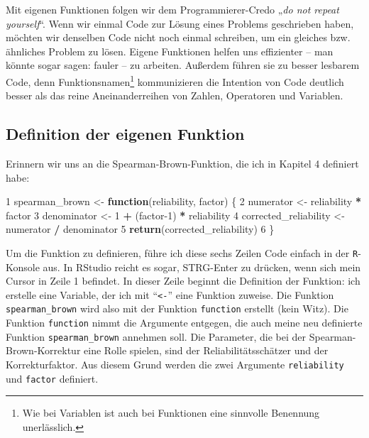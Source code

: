 \documentclass[12pt,]{tufte-book}
\newenvironment{Shaded}{\begin{snugshade}}{\end{snugshade}}
\newcommand{\KeywordTok}[1]{\textcolor[rgb]{0.13,0.29,0.53}{\textbf{#1}}}
\newcommand{\DecValTok}[1]{\textcolor[rgb]{0.00,0.00,0.81}{#1}}
\newcommand{\StringTok}[1]{\textcolor[rgb]{0.31,0.60,0.02}{#1}}
\newcommand{\ControlFlowTok}[1]{\textcolor[rgb]{0.13,0.29,0.53}{\textbf{#1}}}
\newcommand{\OperatorTok}[1]{\textcolor[rgb]{0.81,0.36,0.00}{\textbf{#1}}}
\newcommand{\NormalTok}[1]{#1}
\theoremstyle{definition}
\theoremstyle{definition}
\theoremstyle{definition}
\theoremstyle{remark}
\begin{document}
Mit eigenen Funktionen folgen wir dem Programmierer-Credo „\emph{do not
repeat yourself}``. Wenn wir einmal Code zur Lösung eines Problems
geschrieben haben, möchten wir denselben Code nicht noch einmal
schreiben, um ein gleiches bzw. ähnliches Problem zu lösen. Eigene
Funktionen helfen uns effizienter -- man könnte sogar sagen: fauler --
zu arbeiten. Außerdem führen sie zu besser lesbarem Code, denn
Funktionsnamen\footnote{Wie bei Variablen ist auch bei Funktionen eine
  sinnvolle Benennung unerlässlich.} kommunizieren die Intention von
Code deutlich besser als das reine Aneinanderreihen von Zahlen,
Operatoren und Variablen.

\subsection{Definition der eigenen
Funktion}\label{definition-der-eigenen-funktion}

Erinnern wir uns an die Spearman-Brown-Funktion, die ich in Kapitel 4
definiert habe:

\begin{Shaded}
\begin{Highlighting}[]
\DecValTok{1}\NormalTok{   spearman_brown <-}\StringTok{ }\ControlFlowTok{function}\NormalTok{(reliability, factor) \{}
\DecValTok{2}\NormalTok{       numerator  <-}\StringTok{ }\NormalTok{reliability }\OperatorTok{*}\StringTok{ }\NormalTok{factor}
\DecValTok{3}\NormalTok{       denominator <-}\StringTok{ }\DecValTok{1} \OperatorTok{+}\StringTok{ }\NormalTok{(factor}\DecValTok{-1}\NormalTok{) }\OperatorTok{*}\StringTok{ }\NormalTok{reliability}
\DecValTok{4}\NormalTok{       corrected_reliability <-}\StringTok{ }\NormalTok{numerator }\OperatorTok{/}\StringTok{ }\NormalTok{denominator}
\DecValTok{5}       \KeywordTok{return}\NormalTok{(corrected_reliability)}
\DecValTok{6}\NormalTok{   \}}
\end{Highlighting}
\end{Shaded}

Um die Funktion zu definieren, führe ich diese sechs Zeilen Code einfach
in der \texttt{R}-Konsole aus. In RStudio reicht es sogar, STRG-Enter zu
drücken, wenn sich mein Cursor in Zeile 1 befindet. In dieser Zeile
beginnt die Definition der Funktion: ich erstelle eine Variable, der ich
mit ``\texttt{\textless{}-}'' eine Funktion zuweise. Die Funktion
\texttt{spearman\_brown} wird also mit der Funktion \texttt{function}
erstellt (kein Witz). Die Funktion \texttt{function} nimmt die Argumente
entgegen, die auch meine neu definierte Funktion
\texttt{spearman\_brown} annehmen soll. Die Parameter, die bei der
Spearman-Brown-Korrektur eine Rolle spielen, sind der
Reliabilitätsschätzer und der Korrekturfaktor. Aus diesem Grund werden
die zwei Argumente \texttt{reliability} und \texttt{factor} definiert.
\end{document}
